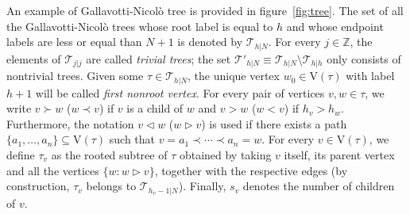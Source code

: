 \documentclass[a4paper, 11pt]{article}
\newcommand{\Z}{\mathbb{Z}}									%
\newcommand{\vrt}{\mathrm{V}}								%
\newcommand{\trees}{\mathcal{T}}							%
\theoremstyle{thm}
\begin{document}
An example of Gallavotti-Nicolò tree is provided in figure~\ref{fig:tree}. The set of all the Gallavotti-Nicolò trees whose root label is equal to $h$ and whose endpoint labels are less or equal than $N+1$ is denoted by $\trees_{h|N}$. For every $j \in \Z$, the elements of $\trees_{j|j}$ are called \emph{trivial trees}; the set $\trees'_{h|N} \equiv \trees_{h|N} \setminus \trees_{h|h}$ only consists of nontrivial trees. Given some $\tau \in \trees_{h|N}$, the unique vertex $w_0 \in \vrt(\tau)$ with label $h+1$ will be called \emph{first nonroot vertex}. For every pair of vertices $v, w \in \tau$, we write $v \succ w$ ($w \prec v$) if $v$ is a child of $w$ and $v > w$ ($w < v$) if $h_v > h_w$. Furthermore, the notation $v \triangleleft w$ ($w \triangleright v$) is used if there exists a path $\lbrace a_1, \dots, a_n \rbrace \subseteq \vrt(\tau)$ such that $v = a_1 \prec \cdots \prec a_n = w$. For every $v \in \vrt(\tau)$, we define $\tau_v$ as the rooted subtree of $\tau$ obtained by taking $v$ itself, its parent vertex and all the vertices $\lbrace w \colon w \triangleright v \rbrace$, together with the respective edges (by construction, $\tau_v$ belongs to $\trees_{h_v - 1|N}$). Finally, $s_v$ denotes the number of children of $v$.
\end{document}
